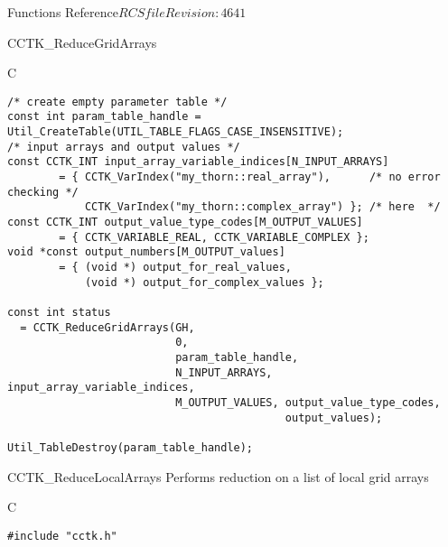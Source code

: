 \begin{cactuspart}{ Functions Reference}{$RCSfile$}{$Revision: 4641 $}
\begin{FunctionDescription}{CCTK\_ReduceGridArrays}
\begin{ExampleSection}
\begin{Example}{C}
\begin{verbatim}
/* create empty parameter table */
const int param_table_handle = Util_CreateTable(UTIL_TABLE_FLAGS_CASE_INSENSITIVE);
/* input arrays and output values */
const CCTK_INT input_array_variable_indices[N_INPUT_ARRAYS]
        = { CCTK_VarIndex("my_thorn::real_array"),      /* no error checking */
            CCTK_VarIndex("my_thorn::complex_array") }; /* here  */
const CCTK_INT output_value_type_codes[M_OUTPUT_VALUES]
        = { CCTK_VARIABLE_REAL, CCTK_VARIABLE_COMPLEX };
void *const output_numbers[M_OUTPUT_values]
        = { (void *) output_for_real_values,
            (void *) output_for_complex_values };

const int status
  = CCTK_ReduceGridArrays(GH,
                          0,
                          param_table_handle,
                          N_INPUT_ARRAYS, input_array_variable_indices,
                          M_OUTPUT_VALUES, output_value_type_codes,
                                           output_values);

Util_TableDestroy(param_table_handle);
\end{verbatim}
\end{Example}
\end{ExampleSection}
\end{FunctionDescription}

\begin{FunctionDescription}{CCTK\_ReduceLocalArrays}
\label{CCTK-ReduceLocalArrays}
Performs reduction on a list of local grid arrays

\begin{SynopsisSection}
\begin{Synopsis}{C}
\begin{verbatim}
#include "cctk.h"


\end{verbatim}
\end{Synopsis}
\end{SynopsisSection}
\end{FunctionDescription}
\end{cactuspart}
